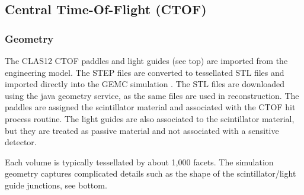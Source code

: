 \subsection{Central Time-Of-Flight (CTOF)}

\subsubsection{Geometry}

The CLAS12 CTOF paddles and light guides (see  top) are imported from the engineering model. The STEP files are converted to tessellated STL files and imported
directly into the GEMC simulation \cite{gemcCad}. The STL files are downloaded using the java geometry service, as the same files are used in reconstruction.
The paddles are assigned the scintillator material and associated with the CTOF hit process routine.
The light guides are also associated to the scintillator material, but they are treated as passive material and not associated with a sensitive detector.

Each volume is typically tessellated by about 1,000 facets. The simulation geometry captures complicated details such as the shape of the scintillator/light guide
junctions, see  bottom.

